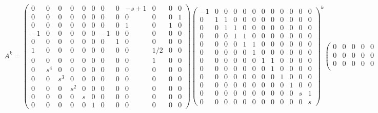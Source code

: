 \documentclass[a4paper,12pt]{article}
\begin{document}
	\pagestyle{empty}
	\begin{landscape}
	\setcounter{MaxMatrixCols}{20}
		$$
		A^k=
		\begin{pmatrix}
		0&    0&    0&    0& 0& 0&  0& 0& -s + 1&   0& 0& 0\\
		0&    0&    0&    0& 0& 0&  0& 0&      0&   0& 0& 1\\
		0&    0&    0&    0& 0& 0&  0& 0&      1&   0& 1& 0\\
		-1&    0&    0&    0& 0& 0& -1& 0&      0&   0& 0& 0\\
		0&    0&    0&    0& 0& 0&  0& 1&      0&   0& 0& 0\\
		1&    0&    0&    0& 0& 0&  0& 0&      0& 1/2& 0& 0\\
		0&    0&    0&    0& 0& 0&  0& 0&      0&   1& 0& 0\\
		0& s^4&   0&   0&0&0& 0&0&     0&  0&0&0\\
		0&    0& s^3&   0&0&0& 0&0&     0&  0&0&0\\
		0&    0&    0& s^2&0&0& 0&0&     0&  0&0&0\\
		0&    0&    0&    0& s& 0&  0& 0&      0&   0& 0& 0\\
		0&    0&    0&    0& 0& 1&  0& 0&      0&   0& 0& 0
		\end{pmatrix}
		\begin{pmatrix}
		-1& 0& 0& 0& 0& 0& 0& 0& 0& 0& 0& 0\\
		0& 1& 1& 0& 0& 0& 0& 0& 0& 0& 0& 0\\
		0& 0& 1& 1& 0& 0& 0& 0& 0& 0& 0& 0\\
		0& 0& 0& 1& 1& 0& 0& 0& 0& 0& 0& 0\\
		0& 0& 0& 0& 1& 1& 0& 0& 0& 0& 0& 0\\
		0& 0& 0& 0& 0& 1& 0& 0& 0& 0& 0& 0\\
		0& 0& 0& 0& 0& 0& 1& 1& 0& 0& 0& 0\\
		0& 0& 0& 0& 0& 0& 0& 1& 0& 0& 0& 0\\
		0& 0& 0& 0& 0& 0& 0& 0& 1& 0& 0& 0\\
		0& 0& 0& 0& 0& 0& 0& 0& 0& 1& 0& 0\\
		0& 0& 0& 0& 0& 0& 0& 0& 0& 0& s& 1\\
		0& 0& 0& 0& 0& 0& 0& 0& 0& 0& 0& s
		\end{pmatrix}^k
		\begin{pmatrix}
		0&    0&    0&    0& 0& 0&  0& 0& -s + 1&   0& 0& 0\\
		0&    0&    0&    0& 0& 0&  0& 0&      0&   0& 0& 1\\
		0&    0&    0&    0& 0& 0&  0& 0&      1&   0& 1& 0\\

\end{pmatrix}$$
\end{landscape}
\end{document}

